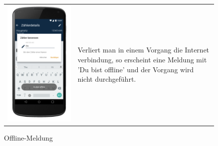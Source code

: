 \begin{figure}[h]
\begin{tabularx}{\textwidth}{X  X}
	\includegraphics[scale = 0.155]{img/AndroidMockup/rename} \caption{Offline-Meldung} & Verliert man in einem Vorgang die Internet verbindung, so erscheint eine Meldung mit 'Du bist offline' und der Vorgang wird nicht durchgeführt.  \\ 
\end{tabularx}
\end{figure}

